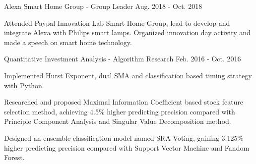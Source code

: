 \documentclass[11pt, a4paper, UTF8]{awesome-cv}
\begin{document}
%
\begin{cventries}
  \cventry
    {Alexa Smart Home Group - Group Leader} %
    {} %
    {} %
    {Aug. 2018 - Oct. 2018} %
    {
      \begin{cvitems} %
        \item {Attended Paypal Innovation Lab Smart Home Group, lead to develop and integrate Alexa with Philips smart lamps. Organized innovation day activity and made a speech on smart home technology.}
      \end{cvitems}
    }

  \cventry
    {Quantitative Investment Analysis  - Algorithm Research} %
    {} %
    {} %
    {Feb. 2016 - Oct. 2016} %
    {
      \begin{cvitems} %
        \item {Implemented Hurst Exponent, dual SMA and classification based timing strategy with Python.}
        \item {Researched and proposed Maximal Information Coefficient based stock feature selection method, achieving 4.5\% higher predicting precision compared with Principle Component Analysis and Singular Value Decomposition method.}
        \item {Designed an ensemble classification model named SRA-Voting, gaining 3.125\% higher predicting precision compared with Support Vector Machine and Fandom Forest.}
      \end{cvitems}
    }
    

\end{cventries}
\end{document}
